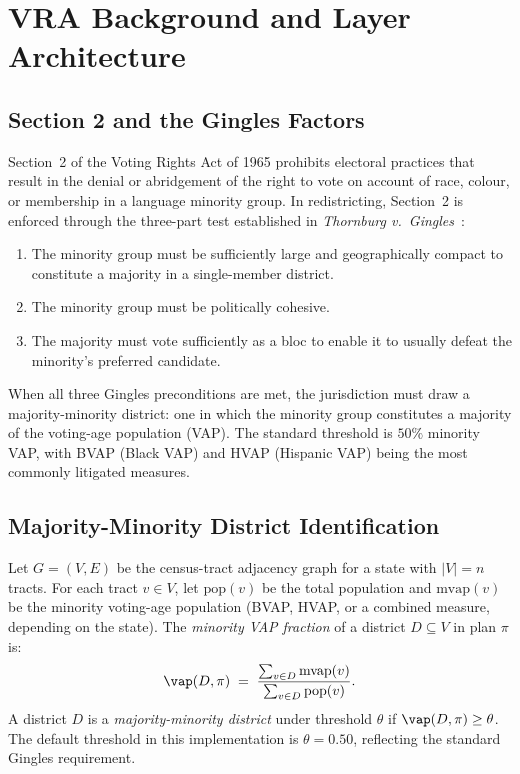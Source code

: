 \section{VRA Background and Layer Architecture}
\label{sec:background}

\subsection{Section 2 and the Gingles Factors}

Section~2 of the Voting Rights Act of 1965 prohibits electoral practices that
result in the denial or abridgement of the right to vote on account of race,
colour, or membership in a language minority group.
In redistricting, Section~2 is enforced through the three-part test established
in \emph{Thornburg v.\ Gingles}~\citep{gingles1986}:
\begin{enumerate}
  \item The minority group must be sufficiently large and geographically compact
        to constitute a majority in a single-member district.
  \item The minority group must be politically cohesive.
  \item The majority must vote sufficiently as a bloc to enable it to usually
        defeat the minority's preferred candidate.
\end{enumerate}
When all three Gingles preconditions are met, the jurisdiction must draw a
majority-minority district: one in which the minority group constitutes a
majority of the voting-age population (VAP).
The standard threshold is $50\%$ minority VAP, with BVAP (Black VAP) and
HVAP (Hispanic VAP) being the most commonly litigated measures.

\subsection{Majority-Minority District Identification}

Let $G = (V, E)$ be the census-tract adjacency graph for a state with $|V| = n$
tracts.
For each tract $v \in V$, let $\mathrm{pop}(v)$ be the total population and
$\mathrm{mvap}(v)$ be the minority voting-age population (BVAP, HVAP, or a
combined measure, depending on the state).
The \emph{minority VAP fraction} of a district $D \subseteq V$ in plan $\pi$ is:
\[
  \vap(D, \pi) \;=\; \frac{\sum_{v \in D} \mathrm{mvap}(v)}{\sum_{v \in D}
  \mathrm{pop}(v)}.
\]
A district $D$ is a \emph{majority-minority district} under threshold $\theta$
if $\vap(D, \pi) \geq \theta$.
The default threshold in this implementation is $\theta = 0.50$, reflecting
the standard Gingles requirement.

